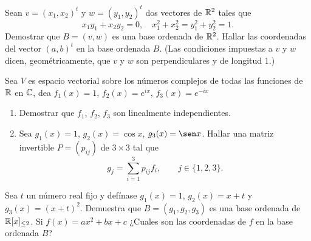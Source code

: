 \begin{exerciselist}
  \item Sean $v = (x_1, x_2)^t$ y $w = (y_1, y_2)^t$ dos vectores de $\mathbb{R}^2$ tales que
    \[ x_1 y_1 + x_2 y_2 = 0, \quad x_1^2 + x_2^2 = y_1^2 + y_2^2 = 1. \]
    Demostrar que $B = (v, w)$ es una base ordenada de $\mathbb{R}^2$. Hallar las coordenadas del vector $(a,b)^t$ en la base ordenada $B$. (Las condiciones impuestas a $v$ y $w$ dicen, geométricamente, que $v$ y $w$ son perpendiculares y de longitud 1.)

  \item Sea $V$ es espacio vectorial sobre los números complejos de todas las funciones de $\mathbb{R}$ en $\mathbb{C}$, dea $f_1(x) = 1$, $f_2(x) = e^{ix}$,  $f_3(x) = e^{-ix}$
    \begin{enumerate}
      \item Demostrar que $f_1$, $f_2$, $f_3$ son linealmente independientes.
      \item Sea $g_1(x)= 1$, $g_2(x) = \cos x$, $g_3(x) = \sen x$. Hallar una matriz invertible $P = (p_{ij})$ de $3 \times 3$ tal que
        \[ g_j = \sum_{i=1}^3 p_{ij} f_i, \qquad j \in \{1, 2, 3\}. \]
    \end{enumerate}

  \item Sea $t$ un número real fijo y defínase $g_1(x) = 1$, $g_2(x) = x+t$ y $g_3(x) = (x+t)^2$. Demuestra que $B = (g_1, g_2, g_3)$ es una base ordenada de $\mathbb{R}[x]_{\leq 2}$. Si $f(x) = ax^2 + bx + c$ ¿Cuales son las coordenadas de $f$ en la base ordenada $B$?
\end{exerciselist}